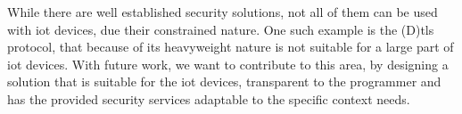\documentclass{llncs}
\begin{document}
While there are well established security solutions, not all of them can be used
with \gls{iot} devices, due their constrained nature. One such example is
the (D)\gls{tls} protocol, that because of its heavyweight nature is not suitable for a large part of \gls{iot} devices. With future work,
we want to contribute to this area, by designing a solution that is suitable for the \gls{iot} devices, transparent
to the programmer and has the provided security services adaptable to the specific context needs.

%
\nocite{*}


%
\printglossary[style=long]
%
\end{document}
